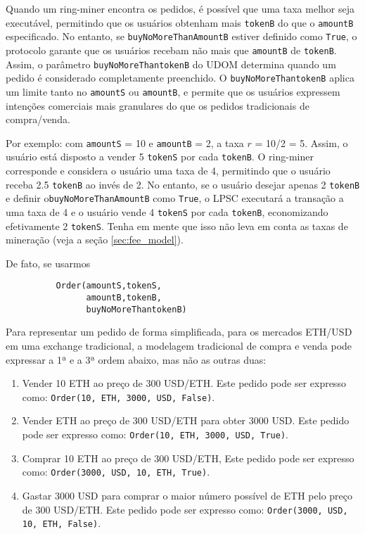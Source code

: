 \documentclass[UTF8,nofonts]{article}
\begin{document}
\begin{multicols}{2}
Quando um ring-miner encontra os pedidos, é possível que uma taxa melhor seja executável, permitindo que os usuários obtenham mais \verb|tokenB| do que o \verb|amountB| especificado. No entanto, se \verb|buyNoMoreThanAmountB| estiver definido como \verb|True|, o protocolo garante que os usuários recebam não mais que \verb|amountB| de \verb|tokenB|. Assim, o parâmetro \verb|buyNoMoreThantokenB| do UDOM determina quando um pedido é considerado completamente preenchido. O \verb|buyNoMoreThantokenB| aplica um limite tanto no \verb|amountS| ou \verb|amountB|, e permite que os usuários expressem intenções comerciais mais granulares do que os pedidos tradicionais de compra/venda.

Por exemplo: com \verb|amountS| = 10 e \verb|amountB| = 2, a taxa $r$ = 10/2 = 5.  Assim, o usuário está disposto a vender 5 \verb|tokenS| por cada \verb|tokenB|. O ring-miner corresponde e considera o usuário uma taxa de 4, permitindo que o usuário receba 2.5 \verb|tokenB| ao invés de 2. No entanto, se o usuário desejar apenas 2 \verb|tokenB| e definir o\verb|buyNoMoreThanAmountB| como  \verb|True|, o LPSC executará a transação a uma taxa de 4 e o usuário vende 4 \verb|tokenS| por cada \verb|tokenB|, economizando efetivamente 2 \verb|tokenS|. Tenha em mente que isso não leva em conta as taxas de mineração (veja a seção \ref{sec:fee_model}).

De fato, se usarmos


\begin{verbatim}
	      Order(amountS,tokenS,
	            amountB,tokenB,
	            buyNoMoreThantokenB)
\end{verbatim}

Para representar um pedido de forma simplificada, para os mercados ETH/USD em uma exchange tradicional, a modelagem tradicional de compra e venda pode expressar a 1ª e a 3ª ordem abaixo, mas não as outras duas:

\begin{enumerate}
	\item Vender 10 ETH ao preço de 300 USD/ETH. Este pedido pode ser expresso como: \verb|Order(10, ETH, 3000, USD, False)|.
	\item Vender ETH ao preço de 300 USD/ETH para obter 3000 USD. Este pedido pode ser expresso como: \verb|Order(10, ETH, 3000, USD, True)|.
	\item Comprar 10 ETH ao preço de 300 USD/ETH, Este pedido pode ser expresso como: \verb|Order(3000, USD, 10, ETH, True)|.
	\item Gastar 3000 USD para comprar o maior número possível de ETH pelo preço de 300 USD/ETH. Este pedido pode ser expresso como: \verb|Order(3000, USD, 10, ETH, False)|.
\end{enumerate}




\end{multicols}
\end{document}
